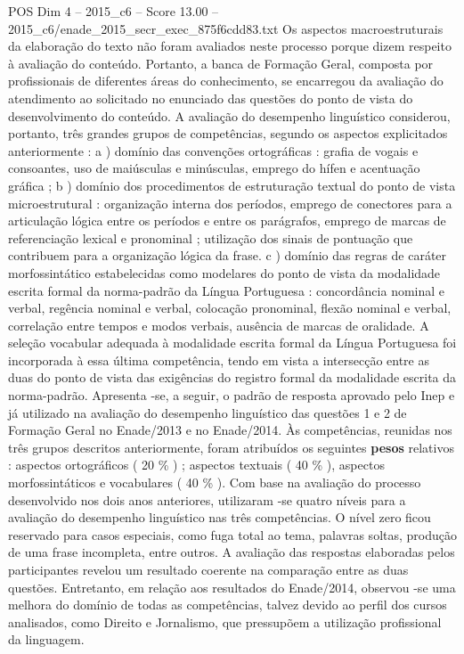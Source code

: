 \begin{textsample}{POS Dim 4 – 2015\_c6 – Score 13.00 – 2015\_c6/enade\_2015\_secr\_exec\_875f6cdd83.txt}
Os aspectos macroestruturais da elaboração do texto não foram avaliados neste processo porque dizem respeito à avaliação do conteúdo.
Portanto, a banca de Formação Geral, composta por profissionais de diferentes áreas do conhecimento, se encarregou da avaliação do atendimento ao solicitado no enunciado das questões do ponto de vista do desenvolvimento do conteúdo.
A avaliação do desempenho linguístico considerou, portanto, três grandes grupos de competências, segundo os aspectos explicitados anteriormente : a ) domínio das convenções ortográficas : grafia de vogais e consoantes, uso de maiúsculas e minúsculas, emprego do hífen e acentuação gráfica ; b ) domínio dos procedimentos de estruturação textual do ponto de vista microestrutural : organização interna dos períodos, emprego de conectores para a articulação lógica entre os períodos e entre os parágrafos, emprego de marcas de referenciação lexical e pronominal ; utilização dos sinais de pontuação que contribuem para a organização lógica da frase. c ) domínio das regras de caráter morfossintático estabelecidas como modelares do ponto de vista da modalidade escrita formal da norma-padrão da Língua Portuguesa : concordância nominal e verbal, regência nominal e verbal, colocação pronominal, flexão nominal e verbal, correlação entre tempos e modos verbais, ausência de marcas de oralidade.
A seleção vocabular adequada à modalidade escrita formal da Língua Portuguesa foi incorporada à essa última competência, tendo em vista a intersecção entre as duas do ponto de vista das exigências do registro formal da modalidade escrita da norma-padrão.
Apresenta -se, a seguir, o padrão de resposta aprovado pelo Inep e já utilizado na avaliação do desempenho linguístico das questões 1 e 2 de Formação Geral no Enade/2013 e no Enade/2014.
Às competências, reunidas nos três grupos descritos anteriormente, foram atribuídos os seguintes \textbf{pesos} relativos : aspectos ortográficos ( 20 \% ) ; aspectos textuais ( 40 \% ), aspectos morfossintáticos e vocabulares ( 40 \% ).
Com base na avaliação do processo desenvolvido nos dois anos anteriores, utilizaram -se quatro níveis para a avaliação do desempenho linguístico nas três competências.
O nível zero ficou reservado para casos especiais, como fuga total ao tema, palavras soltas, produção de uma frase incompleta, entre outros.
A avaliação das respostas elaboradas pelos participantes revelou um resultado coerente na comparação entre as duas questões.
Entretanto, em relação aos resultados do Enade/2014, observou -se uma melhora do domínio de todas as competências, talvez devido ao perfil dos cursos analisados, como Direito e Jornalismo, que pressupõem a utilização profissional da linguagem.

\end{textsample}

